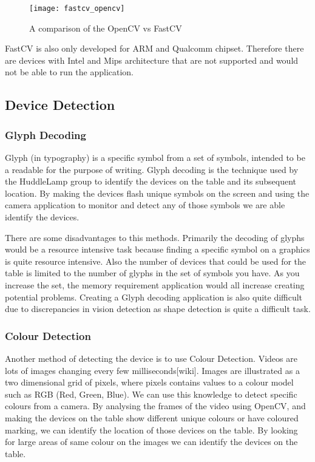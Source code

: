 \begin{figure}[h]
    \centering
    \texttt{[image: fastcv\_opencv]}
    \caption{A comparison of the OpenCV vs FastCV \cite{fastcv_opencv}}
    \label{opencv_fastcv}
\end{figure}

FastCV is also only developed for ARM and Qualcomm chipset. Therefore there are devices with Intel and Mips architecture that are not supported and would not be able to run the application.

\subsection{Device Detection} \label{device_identification}

\subsubsection{Glyph Decoding}
Glyph (in typography) is a specific symbol from a set of symbols, intended to be a readable for the purpose of writing\cite{glyph-wiki}. Glyph decoding is the technique used by the HuddleLamp group to identify the devices on the table and its subsequent location\cite{huddlelamp-paper}. By making the devices flash unique symbols on the screen and using the camera application to monitor and detect any of those symbols we are able identify the devices. 

There are some disadvantages to this methods. Primarily the decoding of glyphs would be a resource intensive task because finding a specific symbol on a graphics is quite resource intensive. Also the number of devices that could be used for the table is limited to the number of glyphs in the set of symbols you have. As you increase the set, the memory requirement application would all increase creating potential problems. Creating a Glyph decoding application is also quite difficult due to discrepancies in vision detection as shape detection is quite a difficult task\cite{shape_recognition}.
\subsubsection{Colour Detection}
Another method of detecting the device is to use Colour Detection. Videos are lots of images changing every few milliseconds[wiki]. Images are illustrated as a two dimensional grid of pixels, where pixels contains values to a colour model such as RGB (Red, Green, Blue). We can use this knowledge to detect specific colours from a camera.
By analysing the frames of the video using OpenCV, and making the devices on the table show different unique colours or have coloured marking, we can identify the location of those devices on the table. By looking for large areas of same colour on the images we can identify the devices on the table.


